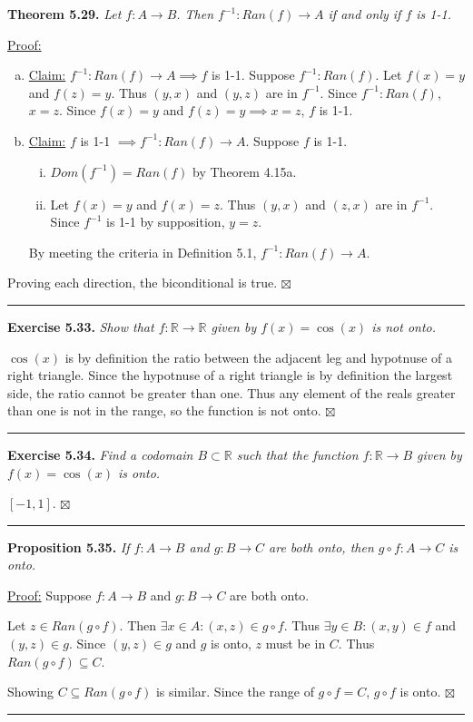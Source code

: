 \documentclass[a4paper,12pt]{article}
\newcommand{\entry}[3]
{
   \noindent\textbf{#1.}
   \emph{#2}
   \bigskip

   \noindent#3
   \bigskip
   \hrule
   \vspace{24pt}
}
\newcommand{\reals}{\mathbb{R}}
\newcommand{\sig}{$\boxtimes$}
\begin{document}
\entry{Theorem 5.29}
{Let $f : A \to B$. Then $f^{-1} : Ran(f) \to A$ if and only if $f$ is 1-1.}
{
\underline{Proof:}
\begin{enumerate}[(a)]
\item
\underline{Claim:} $f^{-1} : Ran(f) \to A \implies f$ is 1-1.
Suppose $f^{-1} : Ran(f)$. Let $f(x) = y$ and $f(z) = y$. Thus $(y, x)$ and $(y, z)$ are in $f^{-1}$. Since $f^{-1} : Ran(f)$, $x = z$. Since $f(x) = y$ and $f(z) = y \implies x = z$, $f$ is 1-1.
\item
\underline{Claim:} $f$ is 1-1 $\implies f^{-1} : Ran(f) \to A$.
Suppose $f$ is 1-1.
   \begin{enumerate}[(i)]
   \item
   $Dom(f^{-1}) = Ran(f)$ by Theorem 4.15a.
   \item
   Let $f(x) = y$ and $f(x) = z$. Thus $(y, x)$ and $(z, x)$ are in $f^{-1}$. Since $f^{-1}$ is 1-1 by supposition, $y = z$.
   \end{enumerate}
   By meeting the criteria in Definition 5.1, $f^{-1} : Ran(f) \to A$.
\end{enumerate}
Proving each direction, the biconditional is true. \sig
}



\entry{Exercise 5.33}
{Show that $f : \reals \to \reals$ given by $f(x) = \cos(x)$ is not onto.}
{$\cos(x)$ is by definition the ratio between the adjacent leg and hypotnuse of a right triangle. Since the hypotnuse of a right triangle is by definition the largest side, the ratio cannot be greater than one. Thus any element of the reals greater than one is not in the range, so the function is not onto. \sig}



\entry{Exercise 5.34}
{Find a codomain $B \subset \reals$ such that the function $f : \reals \to B$ given by $f(x) = \cos(x)$ is onto.}
{
$[-1, 1]$. \sig
}



\entry{Proposition 5.35}
{If $f : A \to B$ and $g : B \to C$ are both onto, then $g \circ f : A \to C$ is onto.}
{
\underline{Proof:} Suppose $f : A \to B$ and $g : B \to C$ are both onto. 

Let $z \in Ran(g \circ f)$. Then $\exists x \in A : (x, z) \in g \circ f$. Thus $\exists y \in B : (x, y) \in f$ and $(y, z) \in g$. Since $(y, z) \in g$ and $g$ is onto, $z$ must be in $C$. Thus $Ran(g \circ f) \subseteq C$.

Showing $C \subseteq Ran(g \circ f)$ is similar. Since the range of $g \circ f = C$, $g \circ f$ is onto. \sig
}
\end{document}
